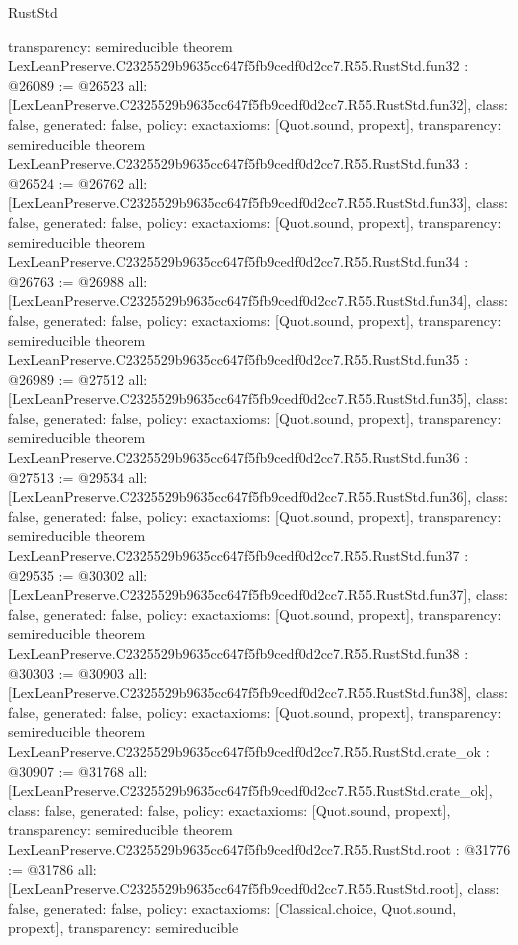 \begin{lexlean}{RustStd}
\begin{coremodule}
{  transparency: semireducible
}
theorem LexLeanPreserve.C2325529b9635cc647f5fb9cedf0d2cc7.R55.RustStd.fun32 : @26089 := @26523 {
  all: [LexLeanPreserve.C2325529b9635cc647f5fb9cedf0d2cc7.R55.RustStd.fun32],
  class: false,
  generated: false,
  policy: exact{axioms: [Quot.sound, propext]},
  transparency: semireducible
}
theorem LexLeanPreserve.C2325529b9635cc647f5fb9cedf0d2cc7.R55.RustStd.fun33 : @26524 := @26762 {
  all: [LexLeanPreserve.C2325529b9635cc647f5fb9cedf0d2cc7.R55.RustStd.fun33],
  class: false,
  generated: false,
  policy: exact{axioms: [Quot.sound, propext]},
  transparency: semireducible
}
theorem LexLeanPreserve.C2325529b9635cc647f5fb9cedf0d2cc7.R55.RustStd.fun34 : @26763 := @26988 {
  all: [LexLeanPreserve.C2325529b9635cc647f5fb9cedf0d2cc7.R55.RustStd.fun34],
  class: false,
  generated: false,
  policy: exact{axioms: [Quot.sound, propext]},
  transparency: semireducible
}
theorem LexLeanPreserve.C2325529b9635cc647f5fb9cedf0d2cc7.R55.RustStd.fun35 : @26989 := @27512 {
  all: [LexLeanPreserve.C2325529b9635cc647f5fb9cedf0d2cc7.R55.RustStd.fun35],
  class: false,
  generated: false,
  policy: exact{axioms: [Quot.sound, propext]},
  transparency: semireducible
}
theorem LexLeanPreserve.C2325529b9635cc647f5fb9cedf0d2cc7.R55.RustStd.fun36 : @27513 := @29534 {
  all: [LexLeanPreserve.C2325529b9635cc647f5fb9cedf0d2cc7.R55.RustStd.fun36],
  class: false,
  generated: false,
  policy: exact{axioms: [Quot.sound, propext]},
  transparency: semireducible
}
theorem LexLeanPreserve.C2325529b9635cc647f5fb9cedf0d2cc7.R55.RustStd.fun37 : @29535 := @30302 {
  all: [LexLeanPreserve.C2325529b9635cc647f5fb9cedf0d2cc7.R55.RustStd.fun37],
  class: false,
  generated: false,
  policy: exact{axioms: [Quot.sound, propext]},
  transparency: semireducible
}
theorem LexLeanPreserve.C2325529b9635cc647f5fb9cedf0d2cc7.R55.RustStd.fun38 : @30303 := @30903 {
  all: [LexLeanPreserve.C2325529b9635cc647f5fb9cedf0d2cc7.R55.RustStd.fun38],
  class: false,
  generated: false,
  policy: exact{axioms: [Quot.sound, propext]},
  transparency: semireducible
}
theorem LexLeanPreserve.C2325529b9635cc647f5fb9cedf0d2cc7.R55.RustStd.crate_ok : @30907 := @31768 {
  all: [LexLeanPreserve.C2325529b9635cc647f5fb9cedf0d2cc7.R55.RustStd.crate_ok],
  class: false,
  generated: false,
  policy: exact{axioms: [Quot.sound, propext]},
  transparency: semireducible
}
theorem LexLeanPreserve.C2325529b9635cc647f5fb9cedf0d2cc7.R55.RustStd.root : @31776 := @31786 {
  all: [LexLeanPreserve.C2325529b9635cc647f5fb9cedf0d2cc7.R55.RustStd.root],
  class: false,
  generated: false,
  policy: exact{axioms: [Classical.choice, Quot.sound, propext]},
  transparency: semireducible
}


\end{coremodule}
\end{lexlean}
